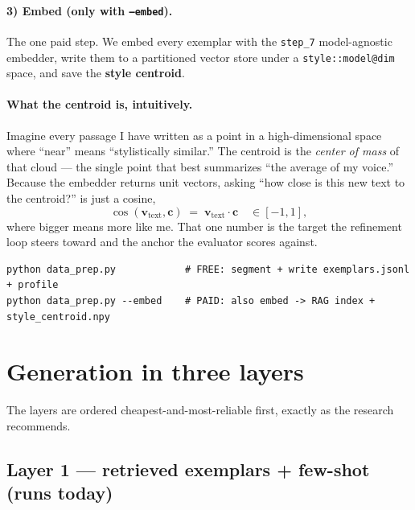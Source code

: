\documentclass[11pt]{article}
\newcommand{\code}[1]{\texttt{#1}}
\newcommand{\cossim}{\operatorname{cos}}
\begin{document}
\paragraph{3) Embed (only with \code{--embed}).} The one paid step. We embed every exemplar with the
\code{step\_7} model-agnostic embedder, write them to a partitioned vector store under a
\code{style::model@dim} space, and save the \textbf{style centroid}.

\paragraph{What the centroid is, intuitively.} Imagine every passage I have written as a point in a
high-dimensional space where ``near'' means ``stylistically similar.'' The centroid is the
\emph{center of mass} of that cloud --- the single point that best summarizes ``the average of my
voice.'' Because the embedder returns unit vectors, asking ``how close is this new text to the
centroid?'' is just a cosine,
\[
  \cossim(\mathbf{v}_{\text{text}}, \mathbf{c})
  \;=\; \mathbf{v}_{\text{text}} \cdot \mathbf{c}
  \quad\in [-1, 1],
\]
where bigger means more like me. That one number is the target the refinement loop steers toward and
the anchor the evaluator scores against.

\begin{lstlisting}
python data_prep.py            # FREE: segment + write exemplars.jsonl + profile
python data_prep.py --embed    # PAID: also embed -> RAG index + style_centroid.npy
\end{lstlisting}

\section{Generation in three layers}

The layers are ordered cheapest-and-most-reliable first, exactly as the research recommends.

\subsection{Layer 1 --- retrieved exemplars + few-shot (runs today)}
\end{document}
